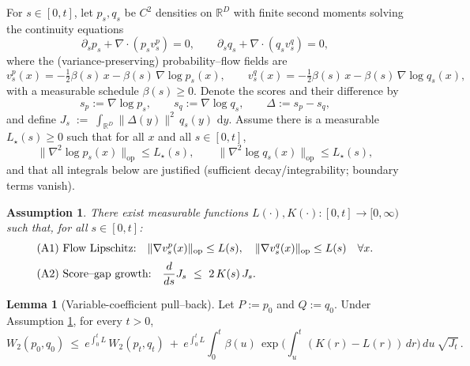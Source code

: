 \documentclass[12pt]{article}
\newtheorem{assumption}{Assumption}
\theoremstyle{definition} %
\newtheorem{lemma}{Lemma}
\newcommand{\R}{\mathbb{R}}
\newcommand{\dd}{\,\mathrm{d}}
\begin{document}
For $s\in[0,t]$, let $p_s,q_s$ be $C^2$ densities on $\R^D$ with finite second moments solving the continuity equations
\begin{equation}\label{eq:CE}
\partial_s p_s + \nabla\!\cdot(p_s v^p_s)=0,\qquad
\partial_s q_s + \nabla\!\cdot(q_s v^q_s)=0,
\end{equation}
where the (variance-preserving) probability--flow fields are
\begin{equation}\label{eq:flows}
v^p_s(x)= -\tfrac12 \beta(s)\,x - \beta(s)\,\nabla\log p_s(x),\qquad
v^q_s(x)= -\tfrac12 \beta(s)\,x - \beta(s)\,\nabla\log q_s(x),
\end{equation}
with a measurable schedule $\beta(s)\ge 0$. Denote the scores and their difference by
\[
s_p:=\nabla\log p_s,\qquad s_q:=\nabla\log q_s,\qquad \Delta:=s_p-s_q,
\]
and define 
$J_s \;:=\; \int_{\R^D} \|\Delta(y)\|^2\,q_s(y)\,\dd y.$
Assume there is a measurable $L_\star(s)\ge 0$ such that for all $x$ and all $s\in[0,t]$,
\begin{equation}\label{eq:HessianBound}
\|\nabla^2\log p_s(x)\|_{\mathrm{op}} \le L_\star(s),\qquad \|\nabla^2\log q_s(x)\|_{\mathrm{op}} \le L_\star(s),
\end{equation}
and that all integrals below are justified (sufficient decay/integrability; boundary terms vanish).



\begin{assumption}
\label{A:12}
There exist measurable functions $L(\cdot),K(\cdot):[0,t]\to[0,\infty)$ such that, for all $s\in[0,t]$:
\begin{align}
&\text{(A1) Flow Lipschitz:}\quad
\|\nabla v^p_s(x)\|_{\rm op}\le L(s),\quad
\|\nabla v^q_s(x)\|_{\rm op}\le L(s)\quad\forall x.
\label{A1}\\[2pt]
&\text{(A2) Score--gap growth:}\quad
\frac{d}{ds}J_s\ \le\ 2\,K(s)\,J_s.
\label{A2}
\end{align}
\end{assumption}

\begin{lemma}[Variable-coefficient pull--back]\label{lem:pullback-LK}
Let $P:=p_0$ and $Q:=q_0$. Under Assumption \ref{A:12}, for every $t>0$,
\begin{equation}\label{eq:W2-pullback-LK}
W_2(p_0,q_0)\ \le\ e^{\int_0^t L}\,W_2(p_t,q_t)
\ +\ e^{\int_0^t L}\!\int_0^t \beta(u)\,
\exp\!\Big(\int_u^t (K(r)-L(r))\,dr\Big)\,du\ \sqrt{J_t}\,.
\end{equation}
\end{lemma}
\end{document}
